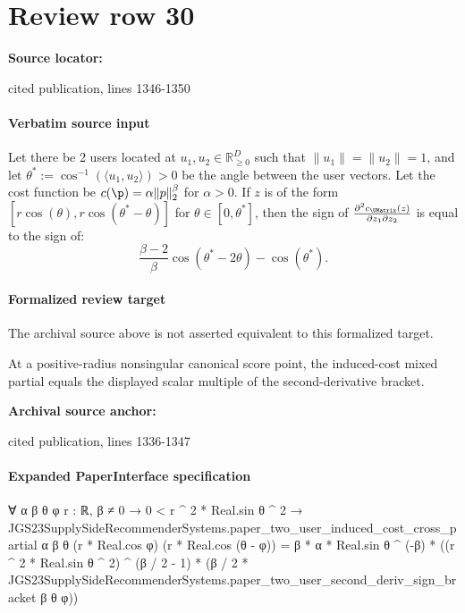 \documentclass[10pt]{article}
\begin{document}
\section*{Review row 30}
\textbf{Source locator:} {\footnotesize\raggedright cited publication, lines 1346-\allowbreak{}1350\par}
\paragraph{Verbatim source input}
\begin{ReviewVerbatim}
\begin{lemma}
\label{lemma:secondderiv}
Let there be 2 users located at $u_1, u_2 \in \mathbb{R}_{\ge 0}^D$ such that  $\|u_1\| = \|u_2\| = 1$, and let $\theta^* := \cos^{-1}\left( \langle u_1, u_2\rangle \right) > 0$ be the angle between the user vectors. Let the cost function be $c(\p) = \alpha \|p\|_2^{\beta}$ for $\alpha > 0$. If $z$ is of the form $[r \cos(\theta), r \cos(\theta^* - \theta)]$ for $\theta \in [0, \theta^*]$, then the sign of $\frac{\partial^2  c_{\UMatrix}(z)}{\partial z_1 \partial z_2}$ is equal to the sign of:
\[\frac{\beta - 2}{\beta} \cos(\theta^* - 2 \theta) - \cos(\theta^*).\]
\end{lemma}
\end{ReviewVerbatim}


\paragraph{Formalized review target}
The archival source above is not asserted equivalent to this formalized target.
\begin{ReviewVerbatim}
At a positive-radius nonsingular canonical score point, the induced-cost mixed partial equals the displayed scalar multiple of the second-derivative bracket.
\end{ReviewVerbatim}

\textbf{Archival source anchor:} {\footnotesize\raggedright cited publication, lines 1336-\allowbreak{}1347\par}
\paragraph{Expanded PaperInterface specification}
\begin{ReviewVerbatim}
∀ {α β θ φ r : ℝ},
  β ≠ 0 →
    0 < r ^ 2 * Real.sin θ ^ 2 →
      JGS23SupplySideRecommenderSystems.paper_two_user_induced_cost_cross_partial α β θ (r * Real.cos φ)
          (r * Real.cos (θ - φ)) =
        β * α * Real.sin θ ^ (-β) *
          ((r ^ 2 * Real.sin θ ^ 2) ^ (β / 2 - 1) *
            (β / 2 * JGS23SupplySideRecommenderSystems.paper_two_user_second_deriv_sign_bracket β θ φ))
\end{ReviewVerbatim}
\end{document}

